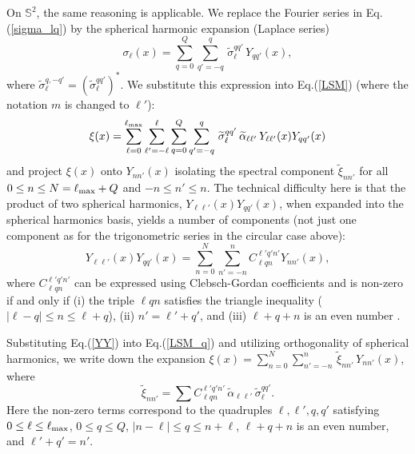 \documentclass[12pt]{article}
\renewcommand{\S}{{\mathbb S}}
\begin{document}
On $\S^2$, the same reasoning is applicable.
We replace the Fourier series in Eq.(\ref{sigma_lq}) by the spherical harmonic
expansion (Laplace series)
%
\begin {equation}
\label{sigma_lqq}
\sigma_\ell(x) = \sum_{q=0}^{Q} \sum_{q'=-q}^{q}     
                          \,\widetilde\sigma_\ell^{qq'} \, Y_{qq'}(x),
\end {equation}
%
where $\widetilde\sigma_\ell^{q,-q'} = (\widetilde\sigma_\ell^{qq'})^*$.
We substitute this expression into Eq.(\ref{LSM}) (where the notation $m$ is changed to $\ell'$):
%
\begin {equation}
\label{LSM_q}
\xi (x) = \sum^{\ell_{\rm max}}_{\ell=0} \sum^\ell_{\ell'=-\ell}  \sum_{q=0}^{Q} \sum_{q'=-q}^{q}     
                          \,\widetilde\sigma_\ell^{qq'}   
                          \,\widetilde\alpha_{\ell \ell'} \, Y_{\ell \ell'} (x) Y_{qq'}(x)
\end {equation}
% 
and project $\xi (x)$ onto $Y_{nn'}(x)$ isolating the spectral component
$\widetilde \xi_{nn'}$ for all $0\le n \le N=\ell_{\rm max}+Q$ and $-n \le n' \le n$. 
The technical difficulty here is that the product  of two spherical harmonics,
 $Y_{\ell \ell'} (x) Y_{qq'}(x)$, when expanded into the 
spherical harmonics basis, yields a number of components (not just one component as 
for the trigonometric series in the circular case above):
%
\begin {equation}
\label{YY}
Y_{\ell \ell'} (x) Y_{qq'}(x) = \sum^{N}_{n=0} \sum^n_{n'=-n} C_{\ell qn}^{\ell'q'n'} Y_{nn'}(x),
\end {equation}
% 
where $C_{\ell qn}^{\ell'q'n'}$ can be expressed using Clebsch-Gordan coefficients 
and is non-zero if and only if 
(i)
the triple $\ell qn$ satisfies the triangle inequality ($|\ell-q|\le n \le \ell +q$),
(ii)
$n'=\ell' + q'$,  and 
(iii) $\ell+q+n$ is an even number \citep[][section 12.9]{Arfken}.

Substituting Eq.(\ref{YY}) into Eq.(\ref{LSM_q}) and utilizing orthogonality
of spherical harmonics, we  write down the expansion 
$\xi(x) =  \sum^{N}_{n=0} \sum^n_{n'=-n} \,\widetilde\xi_{nn'}\,Y_{nn'}(x)$, where
%
\begin {equation}
\label{xi_nn}
\widetilde\xi_{nn'} = \sum C_{\ell qn}^{\ell'q'n'}\,\widetilde\alpha_{\ell\ell'} \,\widetilde\sigma_\ell^{qq'}.
\end {equation}
% 
Here the non-zero terms correspond to the quadruples $\ell,\ell',q,q'$ satisfying
$0\le \ell \le \ell_{\rm max}$,
$0\le q \le Q$,
$|n-\ell|\le q \le n +\ell$,
$\ell+q+n$ is an even number, and
$\ell'+q'=n'$.
\end{document}
